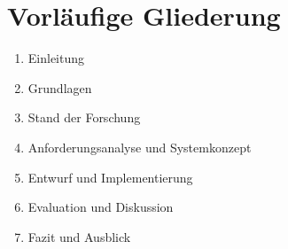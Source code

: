 \section{Vorläufige Gliederung}

\begin{enumerate}
\item Einleitung
\item Grundlagen
\item Stand der Forschung
\item Anforderungsanalyse und Systemkonzept
\item Entwurf und Implementierung
\item Evaluation und Diskussion
\item Fazit und Ausblick
\end{enumerate}